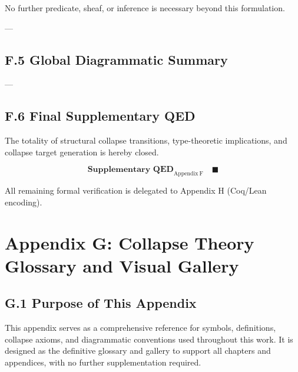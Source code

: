 \documentclass[11pt]{article}
\begin{document}
No further predicate, sheaf, or inference is necessary beyond this formulation.

---

\subsection*{F.5 Global Diagrammatic Summary}

\begin{center}
\end{center}

---

\subsection*{F.6 Final Supplementary QED}

The totality of structural collapse transitions, type-theoretic implications, and collapse target generation is hereby closed.

\[
\textbf{Supplementary QED}_{\mathrm{Appendix\ F}} \quad \blacksquare
\]

All remaining formal verification is delegated to Appendix H (Coq/Lean encoding).



\appendix
\section*{Appendix G: Collapse Theory Glossary and Visual Gallery}

\subsection*{G.1 Purpose of This Appendix}

This appendix serves as a comprehensive reference for symbols, definitions, collapse axioms, and diagrammatic conventions used throughout this work.  
It is designed as the definitive glossary and gallery to support all chapters and appendices, with no further supplementation required.
\end{document}
